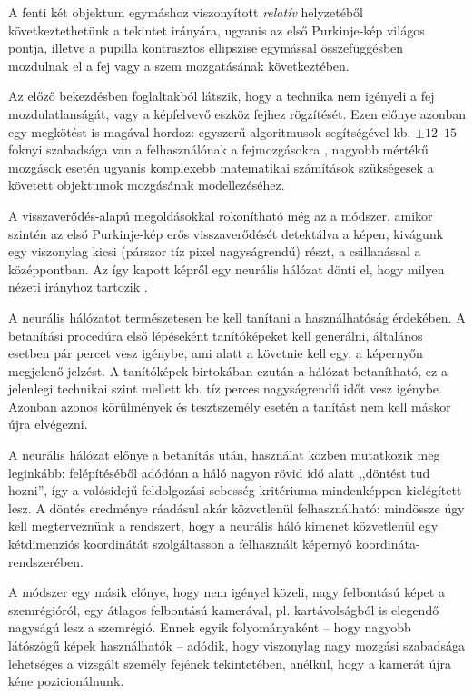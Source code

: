 A fenti két objektum egymáshoz viszonyított \emph{relatív} helyzetéből következtethetünk a tekintet irányára, ugyanis az első Purkinje-kép világos pontja, illetve a pupilla kontrasztos ellipszise egymással összefüggésben mozdulnak el a fej vagy a szem mozgatásának következtében.

Az előző bekezdésben foglaltakból látszik, hogy a technika nem igényeli a fej mozdulatlanságát, vagy a képfelvevő eszköz fejhez rögzítését. Ezen előnye azonban egy megkötést is magával hordoz: egyszerű algoritmusok segítségével kb. $\pm12$--$15$ foknyi szabadsága van a felhasználónak a fejmozgásokra \cite{scott}, nagyobb mértékű mozgások esetén ugyanis komplexebb matematikai számítások szükségesek a követett objektumok mozgásának modellezéséhez.

\bigskip

A visszaverődés-alapú megoldásokkal rokonítható még az a módszer, amikor szintén az első Purkinje-kép erős visszaverődését detektálva a képen, kivágunk egy viszonylag kicsi (párszor tíz pixel nagyságrendű) részt, a csillanással a középpontban. Az így kapott képről egy neurális hálózat dönti el, hogy milyen nézeti irányhoz tartozik \cite{baluja}.

A neurális hálózatot természetesen be kell tanítani a használhatóság érdekében. A betanítási procedúra első lépéseként tanítóképeket kell generálni, általános esetben pár percet vesz igénybe, ami alatt a követnie kell egy, a képernyőn megjelenő jelzést. A tanítóképek birtokában ezután a hálózat betanítható, ez a jelenlegi technikai szint mellett kb. tíz perces nagyságrendű időt vesz igénybe. Azonban azonos körülmények és tesztszemély esetén a tanítást nem kell máskor újra elvégezni.

A neurális hálózat előnye a betanítás után, használat közben mutatkozik meg leginkább: felépítéséből adódóan a háló nagyon rövid idő alatt ,,döntést tud hozni'', így a valósidejű feldolgozási sebesség kritériuma mindenképpen kielégített lesz. A döntés eredménye ráadásul akár közvetlenül felhasználható: mindössze úgy kell megterveznünk a rendszert, hogy a neurális háló kimenet közvetlenül egy kétdimenziós koordinátát szolgáltasson a felhasznált képernyő koordináta-rendszerében.

A módszer egy másik előnye, hogy nem igényel közeli, nagy felbontású képet a szemrégióról, egy átlagos felbontású kamerával, pl. kartávolságból is elegendő nagyságú lesz a szemrégió. Ennek egyik folyományaként -- hogy nagyobb látószögű képek használhatók -- adódik, hogy viszonylag nagy mozgási szabadsága lehetséges a vizsgált személy fejének tekintetében, anélkül, hogy a kamerát újra kéne pozicionálnunk.

